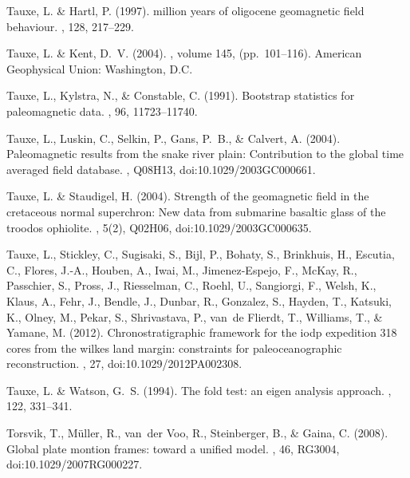\documentclass[11pt]{book}
\begin{document}
{{{\begin{thebibliography}{}
Tauxe, L. \& Hartl, P. (1997).
 million years of oligocene geomagnetic field behaviour.
, 128, 217--229.

Tauxe, L. \& Kent, D.~V. (2004).
, volume 145, (pp.\ 101--116).
\newblock American Geophysical Union: Washington, D.C.

Tauxe, L., Kylstra, N., \& Constable, C. (1991).
\newblock Bootstrap statistics for paleomagnetic data.
, 96, 11723--11740.

Tauxe, L., Luskin, C., Selkin, P., Gans, P.~B., \& Calvert, A. (2004).
\newblock Paleomagnetic results from the snake river plain: Contribution to the
  global time averaged field database.
, Q08H13, doi:10.1029/2003GC000661.

Tauxe, L. \& Staudigel, H. (2004).
\newblock Strength of the geomagnetic field in the cretaceous normal
  superchron: New data from submarine basaltic glass of the troodos ophiolite.
, 5(2), Q02H06,
  doi:10.1029/2003GC000635.

Tauxe, L., Stickley, C., Sugisaki, S., Bijl, P., Bohaty, S., Brinkhuis, H.,
  Escutia, C., Flores, J.-A., Houben, A., Iwai, M., Jimenez-Espejo, F., McKay,
  R., Passchier, S., Pross, J., Riesselman, C., Roehl, U., Sangiorgi, F.,
  Welsh, K., Klaus, A., Fehr, J., Bendle, J., Dunbar, R., Gonzalez, S., Hayden,
  T., Katsuki, K., Olney, M., Pekar, S., Shrivastava, P., van~de Flierdt, T.,
  Williams, T., \& Yamane, M. (2012).
\newblock Chronostratigraphic framework for the iodp expedition 318 cores from
  the wilkes land margin: constraints for paleoceanographic reconstruction.
, 27, doi:10.1029/2012PA002308.

Tauxe, L. \& Watson, G.~S. (1994).
\newblock The fold test: an eigen analysis approach.
, 122, 331--341.

Torsvik, T., M\"{u}ller, R., van~der Voo, R., Steinberger, B., \& Gaina, C.
  (2008).
\newblock Global plate montion frames: toward a unified model.
, 46, RG3004, doi:10.1029/2007RG000227.


\end{thebibliography}}}}
\end{document}
